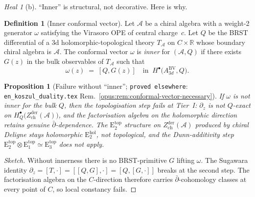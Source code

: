 \documentclass{article}
\newtheorem{proposition}[theorem]{Proposition}
\theoremstyle{definition}
\newtheorem{definition}[theorem]{Definition}
\theoremstyle{remark}
\newtheorem{heal}[theorem]{Heal}
\newcommand{\Zder}{Z^{\mathrm{der}}_{\mathrm{ch}}}
\newcommand{\Ehol}{\mathrm{E}_2^{\mathrm{hol}}}
\newcommand{\Etop}[1]{\mathrm{E}_{#1}^{\mathrm{top}}}
\newcommand{\cA}{\mathcal{A}}
\begin{document}
\begin{heal}[b]
\label{heal:cycle2}
``Inner'' is structural, not decorative. Here is why.

\begin{definition}[Inner conformal vector]
\label{def:opus-inner}
Let $\cA$ be a chiral algebra with a weight-2 generator
$\omega$ satisfying the Virasoro OPE of central charge~$c$.
Let $Q$ be the BRST differential of a 3d
holomorphic-topological theory $T_\cA$ on $C \times \mathbb{R}$
whose boundary chiral algebra is $\cA$. The conformal vector
$\omega$ is \emph{inner} for $(\cA, Q)$ if there exists
$G(z)$ in the bulk observables of $T_\cA$ such that
\begin{equation}\label{eq:opus-inner}
  \omega(z) \;=\; [Q, G(z)]
  \quad\text{in }\ H^\bullet\bigl(A^{\mathrm{BV}}_{3d},Q\bigr).
\end{equation}
\end{definition}

\begin{proposition}[Failure without ``inner'';
\texttt{proved elsewhere}: \texttt{en\_koszul\_duality.tex}
Rem.~\ref*{opus:rem:conformal-vector-necessary}]
\label{prop:opus-need-inner}
If $\omega$ is not inner for the bulk $Q$, then the
topologisation step fails at Tier~I: $\partial_z$ is not
$Q$-exact on $H^\bullet_Q\bigl(\Zder(\cA)\bigr)$, and the
factorisation algebra on the holomorphic direction retains
genuine $\bar\partial$-dependence. The $\Etop{2}$ structure
on $\Zder(\cA)$ produced by chiral Deligne stays
\emph{holomorphic} $\Ehol$, not topological, and the
Dunn-additivity step $\Etop{2} \otimes \Etop{1} \simeq
\Etop{3}$ does not apply.
\end{proposition}

\begin{proof}[Sketch]
Without innerness there is no BRST-primitive $G$ lifting
$\omega$. The Sugawara identity
$\partial_z = [T, \cdot] = [[Q, G], \cdot] = [Q, [G, \cdot]]$
breaks at the second step. The factorisation algebra on
the $C$-direction therefore carries $\bar\partial$-cohomology
classes at every point of $C$, so local constancy fails.
\end{proof}


\end{heal}
\end{document}
